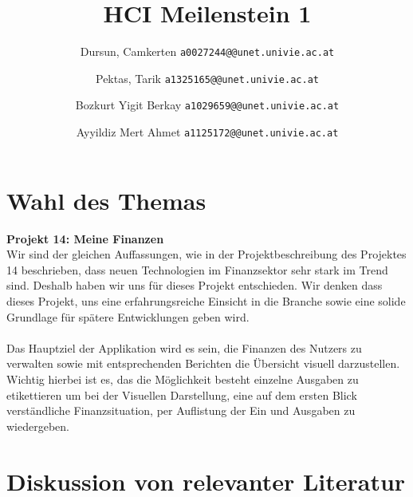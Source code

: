 \documentclass[runningheads,a4paper]{llncs}
\begin{document}
\mainmatter  %

\title{HCI Meilenstein 1}


\author{
  Dursun, Camkerten
  \texttt{a0027244@@unet.univie.ac.at}
  \and
  Pektas, Tarik
  \texttt{a1325165@@unet.univie.ac.at}
  \and
  Bozkurt Yigit Berkay
  \texttt{a1029659@@unet.univie.ac.at}
  \and
  Ayyildiz Mert Ahmet
  \texttt{a1125172@@unet.univie.ac.at}
}



\maketitle

\section{Wahl des Themas}
\textbf {Projekt 14: Meine Finanzen}\\

Wir sind der gleichen Auffassungen, wie in der Projektbeschreibung des Projektes 14 beschrieben, dass neuen Technologien im Finanzsektor sehr stark im Trend sind. Deshalb haben wir uns für dieses Projekt entschieden. Wir denken dass dieses Projekt, uns eine erfahrungsreiche Einsicht in die Branche sowie eine solide Grundlage für spätere Entwicklungen geben wird. \\\\Das Hauptziel der Applikation wird  es sein, die Finanzen des Nutzers zu verwalten sowie mit entsprechenden Berichten die Übersicht visuell darzustellen. Wichtig hierbei ist es, das die Möglichkeit besteht einzelne Ausgaben zu etikettieren um bei der Visuellen Darstellung, eine auf dem ersten Blick verständliche Finanzsituation, per Auflistung der Ein und Ausgaben zu wiedergeben. 


\section{Diskussion von relevanter Literatur}
\end{document}
